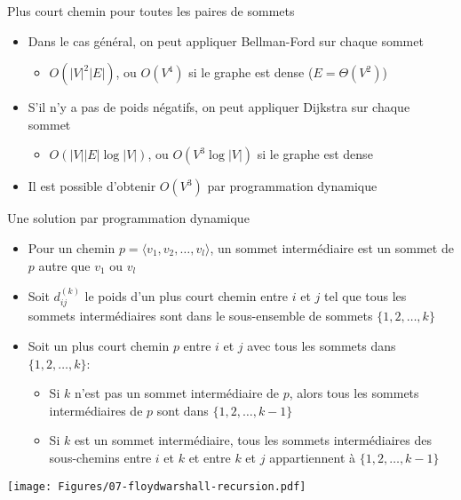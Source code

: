 \begin{frame}{Plus court chemin pour toutes les paires de sommets}

\begin{itemize}
\item Dans le cas général, on peut appliquer Bellman-Ford sur chaque sommet
\begin{itemize}
\item $O(|V|^2 |E|)$, ou $O(V^4)$ si le graphe est dense ($E=\Theta(V^2)$)
\end{itemize}

\bigskip

\item S'il n'y a pas de poids négatifs, on peut appliquer Dijkstra sur chaque sommet
\begin{itemize}
\item $O(|V| |E| \log |V|)$, ou $O(V^3 \log |V|)$ si le graphe est dense
\end{itemize}

\bigskip

\item Il est possible d'obtenir $O(V^3)$ par programmation dynamique
\end{itemize}

\end{frame}

\begin{frame}{Une solution par programmation dynamique}
\begin{itemize}
\item Pour un chemin $p=\langle v_1,v_2,\ldots,v_l\rangle$, un sommet
\alert{intermédiaire} est un sommet de $p$ autre que $v_1$ ou $v_l$
\item Soit $d_{ij}^{(k)}$ le poids d'un plus court chemin entre $i$ et $j$ tel que tous les sommets intermédiaires sont dans le sous-ensemble de sommets $\{1,2,\ldots,k\}$
\item Soit un plus court chemin $p$ entre $i$ et $j$ avec tous les sommets dans $\{1,2,\ldots,k\}$:
\begin{itemize}
\item Si $k$ n'est pas un sommet intermédiaire de $p$, alors tous les sommets intermédiaires de $p$ sont dans $\{1,2,\ldots,k-1\}$
\item Si $k$ est un sommet intermédiaire, tous les sommets intermédiaires des sous-chemins entre $i$ et $k$ et entre $k$ et $j$ appartiennent à $\{1,2,\ldots,k-1\}$
\end{itemize}
\end{itemize}

\centerline{\texttt{[image: Figures/07-floydwarshall-recursion.pdf]}}


\end{frame}



